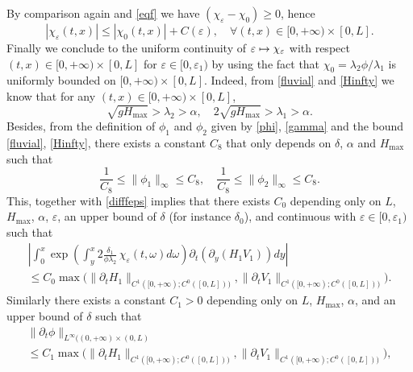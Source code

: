 \documentclass[JEP,XML,SOM,Unicode]{cedram}
\newcommand\mto{\mathchoice{\longmapsto}{\mapsto}{\mapsto}{\mapsto}}
\theoremstyle{definition}
\begin{document}
By {comparison} again and \eqref{eqf} we have $(\chi_{\varepsilon}-\chi_{0})\geq 0$, hence
\begin{equation*}
|\chi_{\varepsilon}(t,x)|\leq |\chi_{0}(t,x)|+ C(\varepsilon),\quad\forall (t,x)\in[0,+\infty)\times[0,L].
\end{equation*}
Finally we conclude to the uniform continuity of $\varepsilon\mto \chi_{\varepsilon}$ with respect $(t,x)\in[0,+\infty)\times[0,L]$ for $\varepsilon \in [0,\varepsilon_{1})$ by using the fact that $\chi_{0}=\lambda_{2}\phi/\lambda_{1}$ is uniformly bounded on $[0,+\infty)\times[0,L]$. Indeed, from \eqref{fluvial} and \eqref{Hinfty} we know that for any $(t,x)\in[0,{+}\infty)\times[0,L]$,
\begin{equation}
\sqrt{g H_{\max}}>\lambda_{2}>\alpha,\quad2\sqrt{gH_{\max}}>\lambda_{1}>\alpha.
\label{bornel1l2}
\end{equation}
Besides, from the definition of $\phi_{1}$ and $\phi_{2}$ given by \eqref{phi}, \eqref{gamma} and the bound \eqref{fluvial}, \eqref{Hinfty}, there exists a constant $C_{8}$ that only depends on
$\delta$, $\alpha$ and $H_{\max}$ such that
\begin{equation}
\frac{1}{C_{8}}\leq\lVert\phi_{1}\rVert_{\infty}\leq C_{8},\quad\frac{1}{C_{8}}\leq\lVert\phi_{2}\rVert_{\infty}\leq C_{8}.
\label{bornephi1phi2}
\end{equation}
This, together with \eqref{difffeps} implies that there exists $C_{0}$ depending only on $L$, $H_{\max}$, $\alpha$, $\varepsilon$, {an upper bound of $\delta$ (for instance $\delta_{0}$),} and continuous with $\varepsilon\in[0,\varepsilon_{1})$ such that
\begin{multline*}
\left|\int_{0}^{x}\exp\left(\int_{y}^{x}2\frac{\delta_{1}}{\phi\lambda_{2}}\,\chi_{\varepsilon}(t,\omega) d\omega\right)\partial_{t}(\partial_{y}(H_{1}V_{1}))dy\right|\\
\leq C_{0} \max \bigl(\lVert\partial_{t}H_{1}\rVert_{C^{1}([0,+\infty);C^{0}([0,L]))},\lVert\partial_{t}V_{1}\rVert_{C^{1}([0,+\infty);C^{0}([0,L]))}\bigr).
\end{multline*}
Similarly
there exists a constant $C_{1}>0$ depending only on $L$, $H_{\max}$, $\alpha${, and an upper bound of $\delta$} such that
\begin{multline}
\label{dphi}
\rVert \partial_{t}{\phi}\lVert_{L^{\infty}((0,+\infty)\times(0,L)}\\
\leq C_{1} \max \bigl(\lVert\partial_{t}H_{1}\rVert_{C^{1}([0,+\infty);C^{0}([0,L]))},\lVert\partial_{t}V_{1}\rVert_{C^{1}([0,+\infty);C^{0}([0,L]))} \bigr),
\end{multline}
\end{document}
